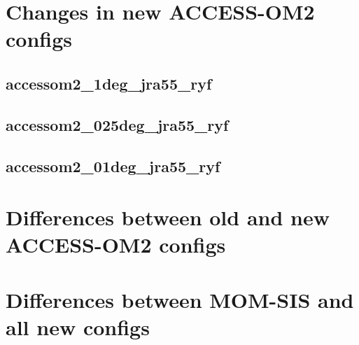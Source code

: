 \documentclass[10pt]{article}
\newcommand{\nmldiffer}[1]{#1} %
\newcommand{\doscript}[1]{{\footnotesize\textsf{}}}
\begin{document}
\newpage
\section{Changes in new ACCESS-OM2 configs}
\subsection{accessom2_1deg_jra55_ryf}
\doscript{/Users/andy/anaconda/bin/python3 /Users/andy/bin/nmltab.py -d --format latex original/hogg_accessom2_1deg_jra55_ryf_input.nml new_accessom2_1deg_jra55_ryf_input.nml }
\newpage
\subsection{accessom2_025deg_jra55_ryf}
\doscript{/Users/andy/anaconda/bin/python3 /Users/andy/bin/nmltab.py -d --format latex original/kiss_accessom2_025deg_jra55_ryf_input.nml new_accessom2_025deg_jra55_ryf_input.nml}
\subsection{accessom2_01deg_jra55_ryf}
\doscript{/Users/andy/anaconda/bin/python3 /Users/andy/bin/nmltab.py -d --format latex original/hogg_accessom2_01deg_jra55_ryf_input.nml new_accessom2_01deg_jra55_ryf_input.nml}

\newpage
\section{Differences between old and new ACCESS-OM2 configs}
\renewcommand{\nmldiffer}[1]{\colorbox{hilite}{#1}}\setlength{\fboxsep}{0pt} %
\doscript{/Users/andy/anaconda/bin/python3 /Users/andy/bin/nmltab.py --format latex original/hogg_accessom2_1deg_jra55_ryf_input.nml new_accessom2_1deg_jra55_ryf_input.nml original/kiss_accessom2_025deg_jra55_ryf_input.nml new_accessom2_025deg_jra55_ryf_input.nml original/hogg_accessom2_01deg_jra55_ryf_input.nml new_accessom2_01deg_jra55_ryf_input.nml}

\newpage
\section{Differences between MOM-SIS and all new configs}
\doscript{/Users/andy/anaconda/bin/python3 /Users/andy/bin/nmltab.py -d --format latex original/fabio_momsis1_input.nml original/paul_momsis025_input.nml original/fanghua_momsis01v5KDS75_WOA13_input.nml new_accessom2_1deg_jra55_ryf_input.nml new_accessom2_025deg_jra55_ryf_input.nml new_accessom2_01deg_jra55_ryf_input.nml}
\end{document}
